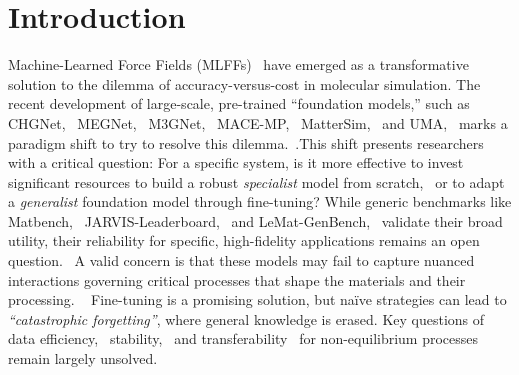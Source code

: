 \documentclass[pdflatex,sn-mathphys-num]{sn-jnl}%
\theoremstyle{thmstyleone}%
\theoremstyle{thmstyletwo}%
\theoremstyle{thmstylethree}%
\begin{document}
\section{Introduction}

Machine-Learned Force Fields (MLFFs)~\citep{unke_machine_2021, ssmith_ani-1_2017, chen_accurate_2017, batatia_mace_nodate,vandermause_active_2022, batzner_e3-equivariant_2022, bartok_gaussian_2010, friederich2021machine, zeng_deepmd-kit_2023, wines_chips-ff_2025, musaelian_learning_2023, chen_universal_2022, lindsey2017chimes,  xie2018crystal} have emerged as a transformative solution to the dilemma of accuracy-versus-cost in molecular simulation. The recent development of large-scale, pre-trained ``foundation models,'' such as CHGNet,~\citep{deng_chgnet_2023} MEGNet,~\citep{chen_graph_2019} M3GNet,~\citep{chen_universal_2022} MACE-MP,~\citep{batatia_mace_nodate} MatterSim,~\citep{yang_mattersim_2024} and UMA,~\citep{wood_uma_2025} marks a paradigm shift to try to resolve this dilemma.~\citep{merchant_scaling_2023}.This shift presents researchers with a critical question: For a specific system, is it more effective to invest significant resources to build a robust \textit{specialist} model from scratch,~\citep{zhang_deep_2018, smith_approaching_2017, chmiela_sgdml_2017} or to adapt a \textit{generalist} foundation model through fine-tuning? While generic benchmarks like Matbench,~\citep{dunn_benchmarking_2020} JARVIS-Leaderboard,~\citep{choudhary2024jarvis} and LeMat-GenBench,~\citep{betala2025lemat} validate their broad utility, their reliability for specific, high-fidelity applications remains an open question.~\citep{friederich_machine-learned_2021, deringer_machine_2019, jacobs2025practical}  A valid concern is that these models may fail to capture nuanced interactions governing critical processes that shape the materials and their processing. ~\citep{schran_machine_2020, kapil_assessment_2022, grisafi_transferable_2018, liu2023discrepancies} Fine-tuning is a promising solution, but naïve strategies can lead to \textit{``catastrophic forgetting''}, where general knowledge is erased. Key questions of data efficiency,~\citep{janet_designing_2019, lookman_active_2019} stability,~\citep{zuo_performance_2020, jinnouchi_phase_2020} and transferability~\citep{zeni_data_2021, vandermause_on--fly_2020} for non-equilibrium processes remain largely unsolved. ~\citep{bernstein_quantifying_2019, zhang_active_2019, he2018statistical}
\end{document}
